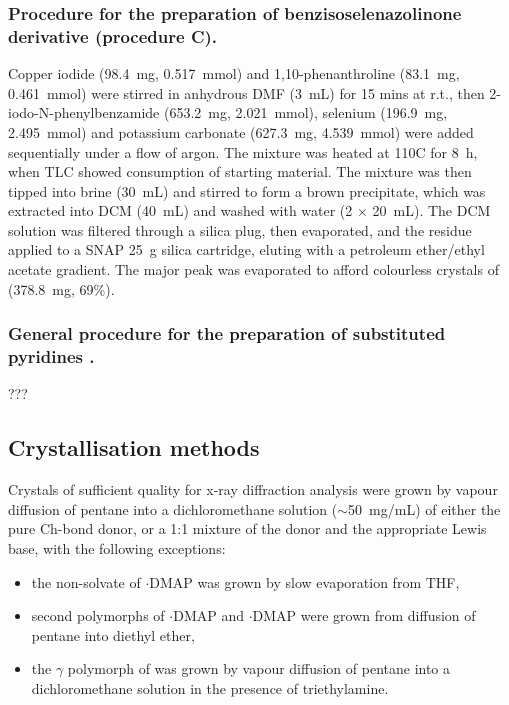 \begin{refsection}
\subsubsection[General procedure C]{Procedure for the preparation of benzisoselenazolinone derivative  (procedure C).}
Copper iodide (98.4~mg, 0.517~mmol) and 1,10-phenanthroline (83.1~mg, 0.461~mmol) were stirred in anhydrous DMF (3~mL) for 15 mins at r.t., then 2-iodo-N-phenylbenz\-amide (653.2~mg, 2.021~mmol), selenium (196.9~mg, 2.495~mmol) and potassium carbonate (627.3~mg, 4.539~mmol) were added sequentially under a flow of argon.
The mixture was heated at 110\degree C for 8~h, when TLC showed consumption of starting material.
The mixture was then tipped into brine (30~mL) and stirred to form a brown precipitate, which was extracted into DCM (40~mL) and washed with water (2 $\times$ 20~mL).
The DCM solution was filtered through a silica plug, then evaporated, and the residue applied to a SNAP 25~g silica cartridge, eluting with a petroleum ether/ethyl acetate gradient.
The major peak was evaporated to afford colourless crystals of  (378.8~mg, 69\%).

\subsubsection[General procedure for substituted pyridines]{General procedure for the preparation of substituted pyridines .}
???


\subsection{Crystallisation methods}
Crystals of sufficient quality for x-ray diffraction analysis were grown by vapour diffusion of pentane into a dichloromethane solution ($\sim$50~mg/mL) of either the pure Ch-bond donor, or a 1:1 mixture of the donor and the appropriate Lewis base, with the following exceptions:
\begin{itemize}
    \item the non-solvate of $\cdot$DMAP was grown by slow evaporation from THF,
    \item second polymorphs of $\cdot$DMAP and $\cdot$DMAP were grown from diffusion of pentane into diethyl ether,
    \item the $\gamma$ polymorph of  was grown by vapour diffusion of pentane into a dichloromethane solution in the presence of triethylamine.
\end{itemize}


\end{refsection}
